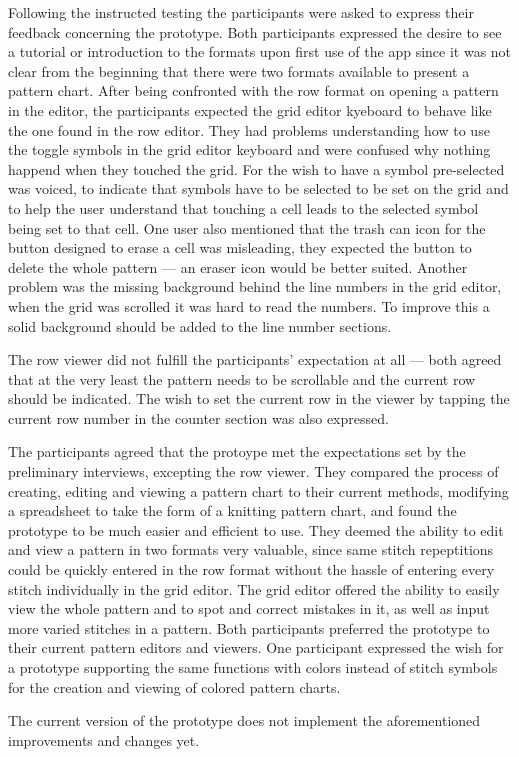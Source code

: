 Following the instructed testing the participants were asked to express their feedback concerning the prototype. Both participants expressed the desire to see a tutorial or introduction to the formats upon first use of the app since it was not clear from the beginning that there were two formats available to present a pattern chart. After being confronted with the row format on opening a pattern in the editor, the participants expected the grid editor kyeboard to behave like the one found in the row editor. They had problems understanding how to use the toggle symbols in the grid editor keyboard and were confused why nothing happend when they touched the grid. For the wish to have a symbol pre-selected was voiced, to indicate that symbols have to be selected to be set on the grid and to help the user understand that touching a cell leads to the selected symbol being set to that cell. One user also mentioned that the trash can icon for the button designed to erase a cell was misleading, they expected the button to delete the whole pattern --- an eraser icon would be better suited. Another problem was the missing background behind the line numbers in the grid editor, when the grid was scrolled it was hard to read the numbers. To improve this a solid background should be added to the line number sections. 

The row viewer did not fulfill the participants' expectation at all --- both agreed that at the very least the pattern needs to be scrollable and the current row should be indicated. The wish to set the current row in the viewer by tapping the current row number in the counter section was also expressed.

The participants agreed that the protoype met the expectations set by the preliminary interviews, excepting the row viewer. They compared the process of creating, editing and viewing a pattern chart to their current methods, modifying a spreadsheet to take the form of a knitting pattern chart, and found the prototype to be much easier and efficient to use. They deemed the ability to edit and view a pattern in two formats very valuable, since same stitch repeptitions could be quickly entered in the row format without the hassle of entering every stitch individually in the grid editor. The grid editor offered the ability to easily view the whole pattern and to spot and correct mistakes in it, as well as input more varied stitches in a pattern. Both participants preferred the prototype to their current pattern editors and viewers. One participant expressed the wish for a prototype supporting the same functions with colors instead of stitch symbols for the creation and viewing of colored pattern charts.

The current version of the prototype does not implement the aforementioned improvements and changes yet.